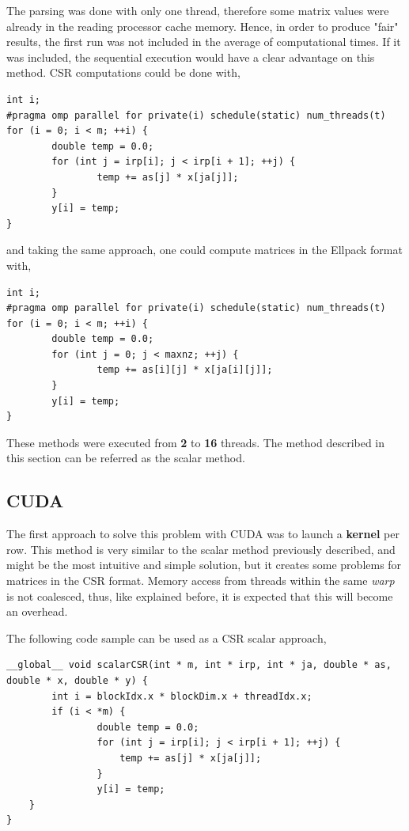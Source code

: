 \documentclass[12pt]{article}
\begin{document}
\par The parsing was done with only one thread, therefore some matrix values were already in the reading processor cache memory. Hence, in order to produce "fair" results, the first run was not included in the average of computational times. If it was included, the sequential execution would have a clear advantage on this method. CSR computations could be done with, 

\begin{lstlisting}[style=banner]
int i;
#pragma omp parallel for private(i) schedule(static) num_threads(t)
for (i = 0; i < m; ++i) {
		double temp = 0.0;
		for (int j = irp[i]; j < irp[i + 1]; ++j) {
				temp += as[j] * x[ja[j]];
		}
		y[i] = temp;
}
\end{lstlisting}

and taking the same approach, one could compute matrices in the Ellpack format with, 

\begin{lstlisting}[style=banner]
int i;
#pragma omp parallel for private(i) schedule(static) num_threads(t)
for (i = 0; i < m; ++i) {
		double temp = 0.0;
		for (int j = 0; j < maxnz; ++j) {
				temp += as[i][j] * x[ja[i][j]];
		}
		y[i] = temp;
}
\end{lstlisting}

\par These methods were executed from \textbf{2} to \textbf{16} threads. The method described in this section can be referred as the scalar method.

\subsection*{CUDA}

\par The first approach to solve this problem with CUDA was to launch a \textbf{kernel} per row. This method is very similar to the scalar method previously described, and might be the most intuitive and simple solution, but it creates some problems for matrices in the CSR format. Memory access from threads within the same \textit{warp} is not coalesced, thus, like explained before, it is expected that this will become an overhead. 
\par The following code sample can be used as a CSR scalar approach,

\begin{lstlisting}
__global__ void scalarCSR(int * m, int * irp, int * ja, double * as, double * x, double * y) {
		int i = blockIdx.x * blockDim.x + threadIdx.x;
		if (i < *m) {
				double temp = 0.0;
				for (int j = irp[i]; j < irp[i + 1]; ++j) {
					temp += as[j] * x[ja[j]];
				}
				y[i] = temp;
	}
}


\end{lstlisting}
\end{document}
